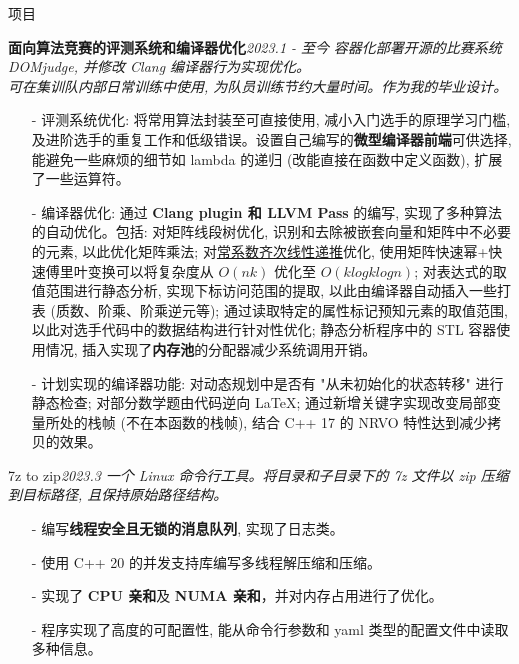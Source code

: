 \documentclass{resume} %
\begin{document}
\begin{rSection}{项目}

\begin{rSubsection}
    {\textbf{面向算法竞赛的评测系统和编译器优化}}{\em 2023.1 - 至今}
    {\textit{容器化部署开源的比赛系统 DOMjudge, 并修改 Clang 编译器行为实现优化。}\\}
    {\textit{可在集训队内部日常训练中使用, 为队员训练节约大量时间。作为我的毕业设计。}}
    \item[]
    \begin{itemize}
        \setlength\itemsep{-0.5em}
        \item[-] 评测系统优化: 将常用算法封装至可直接使用, 减小入门选手的原理学习门槛, 及进阶选手的重复工作和低级错误。设置自己编写的\textbf{微型编译器前端}可供选择, 能避免一些麻烦的细节如 lambda 的递归 (改能直接在函数中定义函数), 扩展了一些运算符。
        \item[-] 编译器优化: 通过 \textbf{Clang plugin 和 LLVM Pass} 的编写, 实现了多种算法的自动优化。包括: 对矩阵线段树优化, 识别和去除被嵌套向量和矩阵中不必要的元素, 以此优化矩阵乘法; 对\href{https://oi-wiki.org/math/poly/linear-recurrence/}{常系数齐次线性递推}优化, 使用矩阵快速幂+快速傅里叶变换可以将复杂度从 $O(nk)$ 优化至 $O(klogklogn)$; 对表达式的取值范围进行静态分析, 实现下标访问范围的提取, 以此由编译器自动插入一些打表 (质数、阶乘、阶乘逆元等); 通过读取特定的属性标记预知元素的取值范围, 以此对选手代码中的数据结构进行针对性优化; 静态分析程序中的 STL 容器使用情况, 插入实现了\textbf{内存池}的分配器减少系统调用开销。
        \item[-] 计划实现的编译器功能: 对动态规划中是否有 "从未初始化的状态转移" 进行静态检查; 对部分数学题由代码逆向 \LaTeX; 通过新增关键字实现改变局部变量所处的栈帧 (不在本函数的栈帧), 结合 C++ 17 的 NRVO 特性达到减少拷贝的效果。
    \end{itemize}
\end{rSubsection}

\begin{rSubsection}
	{7z to zip}{\em 2023.3}
	{\textit{一个 Linux 命令行工具。将目录和子目录下的 7z 文件以 zip 压缩到目标路径, 且保持原始路径结构。}}
	{\textit{}}
	\item[]
	\begin{itemize}
		\setlength\itemsep{-0.5em}
		\item[-] 编写\textbf{线程安全且无锁的消息队列}, 实现了日志类。
		\item[-] 使用 C++ 20 的并发支持库编写多线程解压缩和压缩。
		\item[-] 实现了 \textbf{CPU 亲和}及 \textbf{NUMA 亲和}，并对内存占用进行了优化。
		\item[-] 程序实现了高度的可配置性, 能从命令行参数和 yaml 类型的配置文件中读取多种信息。
	\end{itemize}
\end{rSubsection}


\end{rSection}
\end{document}
